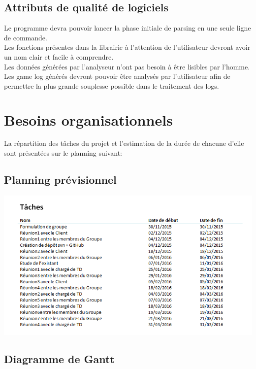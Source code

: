 \subsection{Attributs de qualité de logiciels}

Le programme devra pouvoir lancer la phase initiale de parsing en une seule ligne de commande.\\
Les fonctions présentes dans la librairie à l'attention de l'utilisateur devront avoir un nom clair et facile à comprendre.\\
Les données générées par l'analyseur n’ont pas besoin à être lisibles par l'homme.\\
Les game log générés devront pouvoir être analysés par l'utilisateur afin de permettre la plus grande souplesse possible dans le traitement des logs.

\section{Besoins organisationnels}

La répartition des tâches du projet et l'estimation de la durée de chacune d'elle sont présentées sur le planning suivant:\\

\subsection{Planning prévisionnel}

\includegraphics[scale=0.45,keepaspectratio]{planning}\\

\subsection{Diagramme de Gantt}

